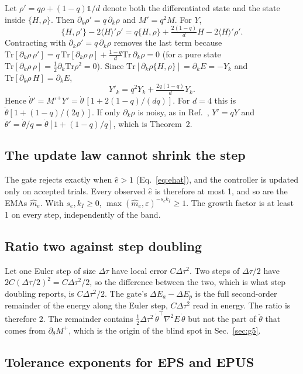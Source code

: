 \documentclass[aps,pra,reprint,superscriptaddress,nofootinbib]{revtex4-2}
\newcommand{\dt}{\Delta\tau}
\newcommand{\thetadot}{\dot\theta}
\newcommand{\Tr}{\mathrm{Tr}}
\begin{document}
Let $\rho'=q\rho+(1-q)\mathbb 1/d$ denote both the differentiated state and the state inside
$\{H,\rho\}$. Then $\partial_k\rho'=q\,\partial_k\rho$ and $M'=q^2M$. For $Y$,
\[
\{H,\rho'\}-2\langle H\rangle'\rho' = q\{H,\rho\}+\tfrac{2(1-q)}{d}H-2\langle H\rangle'\rho' .
\]
Contracting with $\partial_k\rho'=q\,\partial_k\rho$ removes the last term because
$\Tr[\partial_k\rho\,\rho']=q\,\Tr[\partial_k\rho\,\rho]+\tfrac{1-q}{d}\Tr\,\partial_k\rho=0$ (for a
pure state $\Tr[\partial_k\rho\,\rho]=\tfrac12\partial_k\Tr\rho^2=0$). Since
$\Tr[\partial_k\rho\{H,\rho\}]=\partial_kE=-Y_k$ and $\Tr[\partial_k\rho\,H]=\partial_kE$,
\[
Y'_k=q^2Y_k+\tfrac{2q(1-q)}{d}Y_k .
\]
Hence $\thetadot'=M'^{+}Y'=\thetadot\,[1+2(1-q)/(dq)]$. For $d=4$ this is
$\thetadot[1+(1-q)/(2q)]$. If only $\partial_k\rho$ is noisy, as in Ref.~\cite{QDP2024},
$Y'=qY$ and $\thetadot'=\thetadot/q=\thetadot[1+(1-q)/q]$, which is Theorem~2.

\subsection{The update law cannot shrink the step}
\label{app:shrink}

The gate rejects exactly when $\hat e>1$ (Eq.~\eqref{eq:ehat}), and the controller is updated
only on accepted trials. Every observed $\hat e$ is therefore at most 1, and so are the EMAs
$\hat m_e$. With $s_e,k_I\ge0$, $\max(\hat m_e,\varepsilon)^{-s_ek_I}\ge1$. The growth factor
is at least 1 on every step, independently of the band.

\subsection{Ratio two against step doubling}
\label{app:ratio2}

Let one Euler step of size $\dt$ have local error $C\dt^2$. Two steps of $\dt/2$ have
$2C(\dt/2)^2=C\dt^2/2$, so the difference between the two, which is what step doubling
reports, is $C\dt^2/2$. The gate's $\Delta E_a-\Delta E_p$ is the full second-order remainder
of the energy along the Euler step, $C\dt^2$ read in energy. The ratio is therefore 2. The
remainder contains $\tfrac12\dt^2\,\thetadot^\top\nabla^2E\,\thetadot$ but not the part of
$\ddot\theta$ that comes from $\partial_\theta M^{+}$, which is the origin of the blind spot
in Sec.~\ref{sec:g5}.

\subsection{Tolerance exponents for EPS and EPUS}
\label{app:eps}
\end{document}
